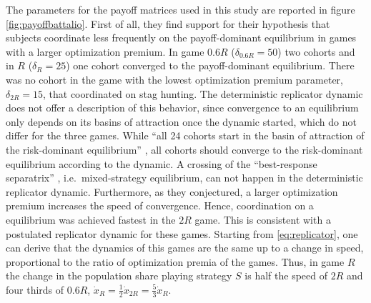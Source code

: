 The parameters for the payoff matrices used in this study 
are reported in figure \ref{fig:payoffbattalio}. 
First of all, they find support for their hypothesis that 
subjects coordinate less frequently on the 
payoff-dominant equilibrium in games with a larger optimization premium. 
In game $0.6R$ ($\delta_{0.6R}=50$) two cohorts and in $R$ ($\delta_{R}=25$)
one cohort converged to the payoff-dominant equilibrium. There was no
cohort in the game with the lowest optimization premium parameter, 
$\delta_{2R}= 15$, that coordinated on stag hunting.
The deterministic replicator dynamic does 
not offer a description of this behavior, since convergence to an 
equilibrium only depends on its basins of attraction once the dynamic 
started, which do not differ for the three games. 
While ``all 24 cohorts start in the basin of attraction
of the risk-dominant equilibrium'' 
\parencite[755]{battalio_optimization_2001}, all cohorts 
should converge to the risk-dominant equilibrium according to the dynamic.
A crossing of the  ``best-response separatrix'' 
\parencite{battalio_optimization_2001}, i.e.\ 
mixed-strategy equilibrium, can not happen in the deterministic replicator 
dynamic. Furthermore, as they conjectured, a larger optimization premium 
increases the speed of convergence. Hence,  coordination on a equilibrium 
was achieved fastest in the $2R$ game. This is consistent with a 
postulated replicator dynamic for these games. Starting from 
\eqref{eq:replicator}, one can derive that the dynamics of this 
games are the same up to a change in speed, proportional to the ratio of 
optimization premia of the games. Thus, in game $R$ the change 
in the population share playing strategy $S$ is half the 
speed of $2R$ and four thirds of $0.6R$,
$\dot{x}_{R} = \frac 12 \dot{x}_{2R} = \frac{5}{3}\dot{x}_R$.

